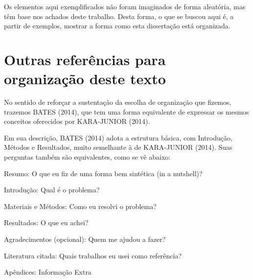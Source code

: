 \documentclass[
12pt,		%
openright,	%
twoside,  %
a4paper,			%
chapter=TITLE,		%
english,			%
french,				%
spanish,			%
brazil				%
]{USPSC-classe/USPSC_RedarTex}
\begin{document}
Os elementos aqui exemplificados n\~ao foram imaginados de forma aleat\'oria, mas t\^em base nos achados deste trabalho. Desta forma, o que se buscou aqui \'e, a partir de exemplos, mostrar a forma como esta disserta\c{c}\~ao est\'a organizada.








\section[Outras refer\^encias para organiza\c{c}\~ao deste texto]{Outras refer\^encias para organiza\c{c}\~ao deste texto}\label{Outras refer\^encias para organiza\c{c}\~ao deste texto}
No sentido de refor\c{c}ar a sustenta\c{c}\~ao da escolha de organiza\c{c}\~ao que fizemos, trazemos  BATES (2014), que tem uma forma equivalente de expressar os mesmos conceitos oferecidos por  KARA-JUNIOR (2014).








Em sua descri\c{c}\~ao, BATES (2014)  adota a estrutura b\'asica, com \textquotedbl Introdu\c{c}\~ao, M\'etodos e Resultados\textquotedbl , muito semelhante \`a de KARA-JUNIOR (2014). Suas perguntas tamb\'em s\~ao equivalentes, como se v\^e abaixo:









\begin{alineas}
\item Resumo: O que eu fiz de uma forma bem sint\'etica (\textquotedbl in a nutshell\textquotedbl )?
\item Introdu\c{c}\~ao: Qual \'e o problema?
\item Materiais e M\'etodos: Como eu resolvi o problema?
\item Resultados: O que eu achei?
\item Agradecimentos (opcional): Quem me ajudou a fazer?
\item Literatura citada: Quais trabalhos eu usei como refer\^encia?
\item Ap\^endices: Informa\c{c}\~ao Extra
\end{alineas}
\end{document}
